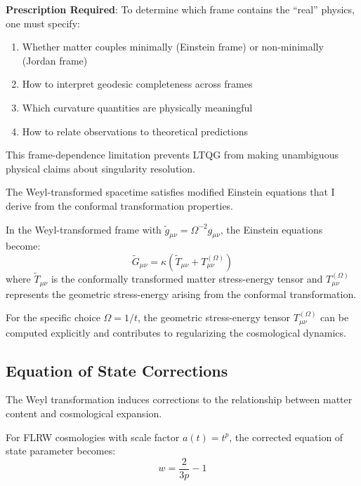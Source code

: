 \textbf{Prescription Required}: To determine which frame contains the ``real'' physics, one must specify:
\begin{enumerate}
\item Whether matter couples minimally (Einstein frame) or non-minimally (Jordan frame)
\item How to interpret geodesic completeness across frames  
\item Which curvature quantities are physically meaningful
\item How to relate observations to theoretical predictions
\end{enumerate}

This frame-dependence limitation prevents LTQG from making unambiguous physical claims about singularity resolution.

The Weyl-transformed spacetime satisfies modified Einstein equations that I derive from the conformal transformation properties.

\begin{theorem}
\label{thm:weyl_einstein_equations}
In the Weyl-transformed frame with $\tilde{g}_{\mu\nu} = \Omega^{-2} g_{\mu\nu}$, the Einstein equations become:
\begin{equation}
\tilde{G}_{\mu\nu} = \kappa \left( \tilde{T}_{\mu\nu} + T_{\mu\nu}^{(\Omega)} \right)
\label{eq:weyl_einstein_equations}
\end{equation}
where $\tilde{T}_{\mu\nu}$ is the conformally transformed matter stress-energy tensor and $T_{\mu\nu}^{(\Omega)}$ represents the geometric stress-energy arising from the conformal transformation.
\end{theorem}

For the specific choice $\Omega = 1/t$, the geometric stress-energy tensor $T_{\mu\nu}^{(\Omega)}$ can be computed explicitly and contributes to regularizing the cosmological dynamics.

\subsection{Equation of State Corrections}
\label{subsec:equation_of_state}

The Weyl transformation induces corrections to the relationship between matter content and cosmological expansion.

\begin{theorem}
\label{thm:corrected_eos}
For FLRW cosmologies with scale factor $a(t) = t^p$, the corrected equation of state parameter becomes:
\begin{equation}
w = \frac{2}{3p} - 1
\label{eq:corrected_eos}
\end{equation}
\end{theorem}


